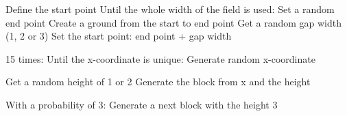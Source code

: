 \begin{verbatimtab}
Define the start point
Until the whole width of the field is used:
  Set a random end point
  Create a ground from the start to end point
  Get a random gap width (1, 2 or 3)
  Set the start point: end point + gap width

15 times:
  Until the x-coordinate is unique:
    Generate random x-coordinate

  Get a random height of 1 or 2
  Generate the block from x and the height

  With a probability of 3:
    Generate a next block with the height 3
\end{verbatimtab}
